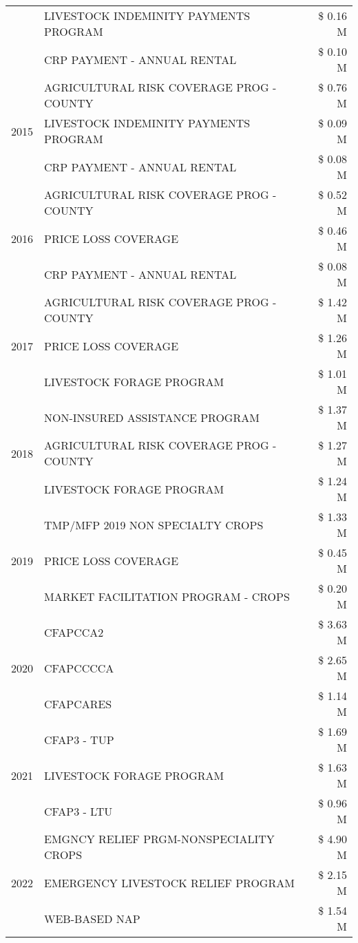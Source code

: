 \begin{tabular}{llr}
 & LIVESTOCK INDEMINITY PAYMENTS PROGRAM & \$ 0.16 M \\
 & CRP PAYMENT - ANNUAL RENTAL & \$ 0.10 M \\
\cline{1-3}
\multirow[t]{3}{*}{2015} & AGRICULTURAL RISK COVERAGE PROG - COUNTY & \$ 0.76 M \\
 & LIVESTOCK INDEMINITY PAYMENTS PROGRAM & \$ 0.09 M \\
 & CRP PAYMENT - ANNUAL RENTAL & \$ 0.08 M \\
\cline{1-3}
\multirow[t]{3}{*}{2016} & AGRICULTURAL RISK COVERAGE PROG - COUNTY & \$ 0.52 M \\
 & PRICE LOSS COVERAGE & \$ 0.46 M \\
 & CRP PAYMENT - ANNUAL RENTAL & \$ 0.08 M \\
\cline{1-3}
\multirow[t]{3}{*}{2017} & AGRICULTURAL RISK COVERAGE PROG - COUNTY & \$ 1.42 M \\
 & PRICE LOSS COVERAGE & \$ 1.26 M \\
 & LIVESTOCK FORAGE PROGRAM & \$ 1.01 M \\
\cline{1-3}
\multirow[t]{3}{*}{2018} & NON-INSURED ASSISTANCE PROGRAM & \$ 1.37 M \\
 & AGRICULTURAL RISK COVERAGE PROG - COUNTY & \$ 1.27 M \\
 & LIVESTOCK FORAGE PROGRAM & \$ 1.24 M \\
\cline{1-3}
\multirow[t]{3}{*}{2019} & TMP/MFP 2019 NON SPECIALTY CROPS & \$ 1.33 M \\
 & PRICE LOSS COVERAGE & \$ 0.45 M \\
 & MARKET FACILITATION PROGRAM - CROPS & \$ 0.20 M \\
\cline{1-3}
\multirow[t]{3}{*}{2020} & CFAPCCA2 & \$ 3.63 M \\
 & CFAPCCCCA & \$ 2.65 M \\
 & CFAPCARES & \$ 1.14 M \\
\cline{1-3}
\multirow[t]{3}{*}{2021} & CFAP3 - TUP & \$ 1.69 M \\
 & LIVESTOCK FORAGE PROGRAM & \$ 1.63 M \\
 & CFAP3 - LTU & \$ 0.96 M \\
\cline{1-3}
\multirow[t]{3}{*}{2022} & EMGNCY RELIEF PRGM-NONSPECIALITY CROPS & \$ 4.90 M \\
 & EMERGENCY LIVESTOCK RELIEF PROGRAM & \$ 2.15 M \\
 & WEB-BASED NAP & \$ 1.54 M \\
\cline{1-3}
\bottomrule
\end{tabular}
